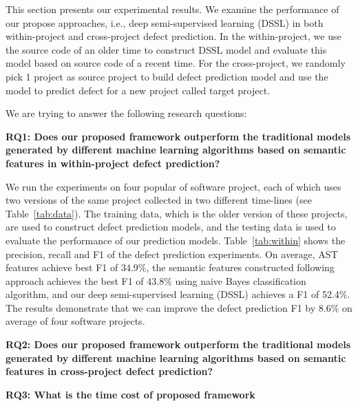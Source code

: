 

This section presents our experimental results. We examine the performance of our propose approaches, i.e., deep semi-supervised learning (DSSL) in both within-project and cross-project defect prediction. In the within-project, we use the source code of an older time to construct DSSL model and evaluate this model based on source code of a recent time. For the cross-project, we randomly pick 1 project as source project to build defect prediction model and use the model to predict defect for a new project called target project.

We are trying to answer the following research questions: 

\textbf{RQ1: Does our proposed framework outperform the traditional models generated by different machine learning algorithms based on semantic features in within-project defect prediction?}

We run the experiments on four popular of software project, each of which uses two versions of the same project collected in two different time-lines (see Table~\ref{tab:data}). The training data, which is the older version of these projects, are used to construct defect prediction models, and the testing data is used to evaluate the performance of our prediction models. Table~\ref{tab:within} shows the precision, recall and F1 of the defect prediction experiments. On average, AST features achieve best F1 of 34.9\%, the semantic features constructed following~\cite{wang2016automatically} approach achieves the best F1 of 43.8\% using naive Bayes classification algorithm, and our deep semi-supervised learning (DSSL) achieves a F1 of 52.4\%. The results demonstrate that we can improve the defect prediction F1 by 8.6\% on average of four software projects. 


\textbf{RQ2: Does our proposed framework outperform the traditional models generated by different machine learning algorithms based on semantic features in cross-project defect prediction?}

\textbf{RQ3: What is the time cost of proposed framework}


